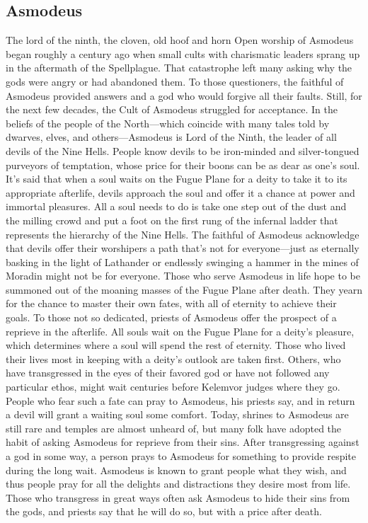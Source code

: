 \documentclass[10pt,a4paper,twoside,twocolumn,openany,bg=print,nodeprecatedcode]{dndbook}
\begin{document}
\subsection{Asmodeus}
The lord of the ninth, the cloven, old hoof and horn
Open worship of Asmodeus began roughly a century ago when small cults with charismatic leaders sprang up in the aftermath of the Spellplague. That catastrophe left many asking why the gods were angry or had abandoned them. To those questioners, the faithful of Asmodeus provided answers and a god who would forgive all their faults. Still, for the next few decades, the Cult of Asmodeus struggled for acceptance.
In the beliefs of the people of the North—which coincide with many tales told by dwarves, elves, and others—Asmodeus is Lord of the Ninth, the leader of all devils of the Nine Hells. People know devils to be iron-minded and silver-tongued purveyors of temptation, whose price for their boons can be as dear as one's soul. It's said that when a soul waits on the Fugue Plane for a deity to take it to its appropriate afterlife, devils approach the soul and offer it a chance at power and immortal pleasures. All a soul needs to do is take one step out of the dust and the milling crowd and put a foot on the first rung of the infernal ladder that represents the hierarchy of the Nine Hells.
The faithful of Asmodeus acknowledge that devils offer their worshipers a path that's not for everyone—just as eternally basking in the light of Lathander or endlessly swinging a hammer in the mines of Moradin might not be for everyone. Those who serve Asmodeus in life hope to be summoned out of the moaning masses of the Fugue Plane after death. They yearn for the chance to master their own fates, with all of eternity to achieve their goals.
To those not so dedicated, priests of Asmodeus offer the prospect of a reprieve in the afterlife. All souls wait on the Fugue Plane for a deity's pleasure, which determines where a soul will spend the rest of eternity. Those who lived their lives most in keeping with a deity's outlook are taken first. Others, who have transgressed in the eyes of their favored god or have not followed any particular ethos, might wait centuries before Kelemvor judges where they go. People who fear such a fate can pray to Asmodeus, his priests say, and in return a devil will grant a waiting soul some comfort.
Today, shrines to Asmodeus are still rare and temples are almost unheard of, but many folk have adopted the habit of asking Asmodeus for reprieve from their sins. After transgressing against a god in some way, a person prays to Asmodeus for something to provide respite during the long wait. Asmodeus is known to grant people what they wish, and thus people pray for all the delights and distractions they desire most from life. Those who transgress in great ways often ask Asmodeus to hide their sins from the gods, and priests say that he will do so, but with a price after death.
\end{document}
